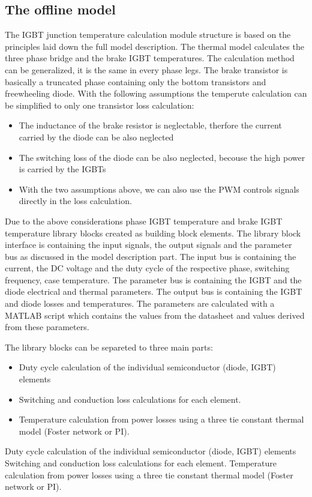 \subsection{The offline model}
The IGBT junction temperature calculation module structure is based on the principles laid down the full model description. The thermal model calculates the three phase bridge and the brake IGBT temperatures. The calculation method can be generalized, it is the same in every phase legs. The brake transistor is basically a truncated phase containing only the bottom transistors and freewheeling diode. With the following assumptions the temperute calculation can be simplified to only one transistor loss calculation:

\begin{itemize}
    \item The inductance of the brake resistor is neglectable, therfore the current carried by the diode can be also neglected
    \item The switching loss of the diode can be also neglected, becouse the high power is carried by the IGBTs
    \item With the two assumptions above, we can also use the PWM controls signals directly in the loss calculation.
\end{itemize}

Due to the above considerations phase IGBT temperature and brake IGBT temperature library blocks created as building block elements. The library block interface is containing the input signals, the output signals and the parameter bus as discussed in the model description part.
The input bus is containing the current, the DC voltage and the duty cycle of the respective phase, switching frequency, case temperature. The parameter bus is containing the IGBT and the diode electrical and thermal parameters. The output bus is containing the IGBT and diode losses and temperatures. The parameters are calculated with a MATLAB script which contains the values from the datasheet and values derived from these parameters.

The library blocks can be separeted to three main parts:
\begin{itemize}
    \item Duty cycle calculation of the individual semiconductor (diode, IGBT) elements
    \item Switching and conduction loss calculations for each element.
    \item Temperature calculation from power losses using a three tie constant thermal model (Foster network or PI). 
\end{itemize}
Duty cycle calculation of the individual semiconductor (diode, IGBT) elements
Switching and conduction loss calculations for each element.
Temperature calculation from power losses using a three tie constant thermal model (Foster network or PI).

